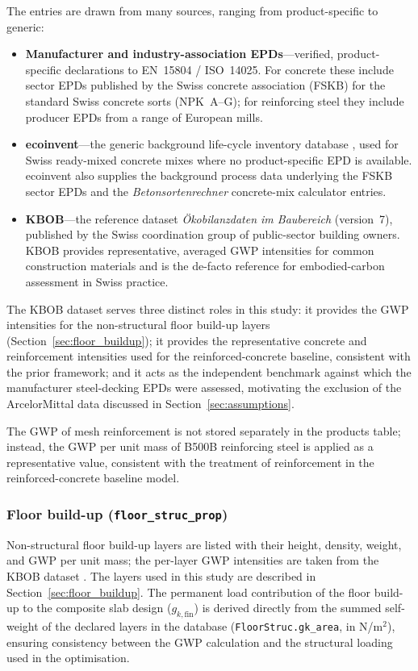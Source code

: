 The entries are drawn from many sources, ranging from product-specific to generic:
\begin{itemize}
    \item \textbf{Manufacturer and industry-association EPDs}---verified, product-specific declarations to EN~15804 / ISO~14025. For concrete these include sector EPDs published by the Swiss concrete association (FSKB) for the standard Swiss concrete sorts (NPK~A--G); for reinforcing steel they include producer EPDs from a range of European mills.
    \item \textbf{ecoinvent}---the generic background life-cycle inventory database \citep{RefWorks:ecoinvent2024}, used for Swiss ready-mixed concrete mixes where no product-specific EPD is available. ecoinvent also supplies the background process data underlying the FSKB sector EPDs and the \emph{Betonsortenrechner} concrete-mix calculator entries.
    \item \textbf{KBOB}---the reference dataset \emph{Ökobilanzdaten im Baubereich} \citep{RefWorks:kbob2022} (version~7), published by the Swiss coordination group of public-sector building owners. KBOB provides representative, averaged GWP intensities for common construction materials and is the de-facto reference for embodied-carbon assessment in Swiss practice.
\end{itemize}

The KBOB dataset serves three distinct roles in this study: it provides the GWP intensities for the non-structural floor build-up layers (Section~\ref{sec:floor_buildup}); it provides the representative concrete and reinforcement intensities used for the reinforced-concrete baseline, consistent with the prior framework; and it acts as the independent benchmark against which the manufacturer steel-decking EPDs were assessed, motivating the exclusion of the ArcelorMittal data discussed in Section~\ref{sec:assumptions}.

The GWP of mesh reinforcement is not stored separately in the products table; instead, the GWP per unit mass of B500B reinforcing steel is applied as a representative value, consistent with the treatment of reinforcement in the reinforced-concrete baseline model.

\subsubsection*{Floor build-up (\texttt{floor\_struc\_prop})}
Non-structural floor build-up layers are listed with their height, density, weight, and GWP per unit mass; the per-layer GWP intensities are taken from the KBOB dataset \citep{RefWorks:kbob2022}. The layers used in this study are described in Section~\ref{sec:floor_buildup}. The permanent load contribution of the floor build-up to the composite slab design ($g_{k,\mathrm{fin}}$) is derived directly from the summed self-weight of the declared layers in the database (\texttt{FloorStruc.gk\_area}, in N/m$^2$), ensuring consistency between the GWP calculation and the structural loading used in the optimisation.

